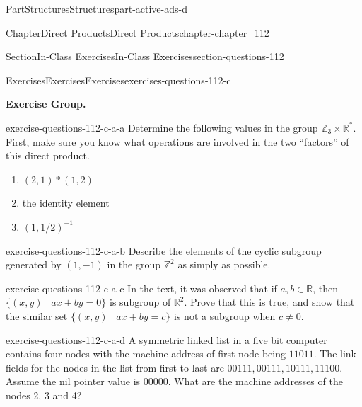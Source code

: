 \documentclass[oneside,10pt,]{book}
\numberwithin{equation}{section}
\begin{document}
\begin{partptx}{Part}{Structures}{}{Structures}{}{}{part-active-ads-d}
\begin{chapterptx}{Chapter}{Direct Products}{}{Direct Products}{}{}{chapter-chapter_112}
\begin{sectionptx}{Section}{In-Class Exercises}{}{In-Class Exercises}{}{}{section-questions-112}
\typeout{************************************************}
%
\begin{exercises-subsection-numberless}{Exercises}{Exercises}{}{Exercises}{}{}{exercises-questions-112-c}
\par\medskip\noindent%
\textbf{Exercise Group.}\space\space%
\begin{exercisegroup}
\begin{divisionexerciseeg}{1}{}{}{exercise-questions-112-c-a-a}%
Determine the following values in the group \(\mathbb{Z}_3 \times  \mathbb{R}^*\).  First, make sure you know what operations are involved in the two ``factors'' of this direct product.%
\begin{enumerate}[label=(\alph*)]
\item{}\(\displaystyle (2,1)* (1,2)\)%
\item{}the identity element%
\item{}\(\displaystyle (1, 1/2)^{-1}\)%
\end{enumerate}
%
\end{divisionexerciseeg}%
\begin{divisionexerciseeg}{2}{}{}{exercise-questions-112-c-a-b}%
Describe the elements of the cyclic subgroup generated by \((1,-1)\) in the group \(\mathbb{Z}^2\) as simply as possible.%
\end{divisionexerciseeg}%
\begin{divisionexerciseeg}{3}{}{}{exercise-questions-112-c-a-c}%
In the text, it was observed that if \(a, b \in  \mathbb{R}\),  then \(\{(x, y) \mid a x + b y = 0\}\) is subgroup of \(\mathbb{R}^2\).  Prove that this is true, and show that the similar set  \(\{(x, y) \mid a x + b y = c\}\) is not a subgroup when \(c \neq 0\).%
\end{divisionexerciseeg}%
\begin{divisionexerciseeg}{4}{}{}{exercise-questions-112-c-a-d}%
A symmetric linked list in a five bit computer contains four nodes with the machine address of first node being \(11011\).  The link fields for the nodes in the list from first to last are \(00111, 00111, 10111, 11100\). Assume the nil pointer value is 00000.  What are the machine addresses of the nodes 2, 3 and 4?%
\end{divisionexerciseeg}%
\end{exercisegroup}
\par\medskip\noindent
\end{exercises-subsection-numberless}
\end{sectionptx}
\end{chapterptx}

\end{partptx}
\end{document}

